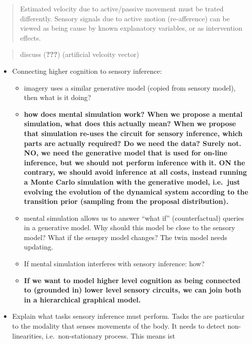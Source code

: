 \documentclass[english,floatsintext,man]{apa6}
\providecommand{\tightlist}{%
  \setlength{\itemsep}{0pt}\setlength{\parskip}{0pt}}
\theoremstyle{definition}
\theoremstyle{definition}
\theoremstyle{remark}
\begin{document}
\begin{quote}
Estimated velocity due to active/passive movement must be trated
differently. Sensory signals due to active motion (re-afference) can be
viewed as being cause by known explanatory variables, or as intervention
effects.
\end{quote}

\begin{quote}
discuss ({\textbf{???}}) (artificial velcoity vector)
\end{quote}

\begin{itemize}
\tightlist
\item
  Connecting higher cognition to sensory inference:

  \begin{itemize}
  \tightlist
  \item
    imagery uses a similar generative model (copied from sensory model),
    then what is it doing?
  \item
    \textbf{how does mental simulation work? When we propose a mental
    simulation, what does this actually mean? When we propose that
    simulation re-uses the circuit for sensory inference, which parts
    are actually required? Do we need the data? Surely not. NO, we need
    the generative model that is used for on-line inference, but we
    should not perform inference with it. ON the contrary, we should
    avoid inference at all costs, instead running a Monte Carlo
    simulation with the generative model, i.e.~just evolving the
    evolution of the dynamical system according to the transition prior
    (sampling from the proposal distribution).}
  \item
    mental simulation allows us to answer \enquote{what if}
    (counterfactual) queries in a generative model. Why should this
    model be close to the sensory model? What if the senspry model
    changes? The twin model needs updating.
  \item
    If mental simulation interferes with sensory inference: how?
  \item
    \textbf{If we want to model higher level cognition as being
    connected to (grounded in) lower level sensory circuits, we can join
    both in a hierarchical graphical model.}
  \end{itemize}
\item
  Explain what tasks sensory inference must perform. Tasks the are
  particular to the modality that senses movements of the body. It needs
  to detect non-linearities, i.e.~non-stationary process. This means ist

\end{itemize}
\end{document}
